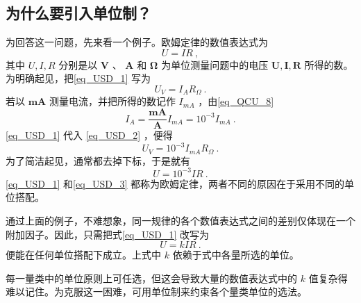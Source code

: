 


\subsection{为什么要引入单位制？}
为回答这一问题，先来看一个例子。欧姆定律的数值表达式为
\begin{equation}\label{eq_USD_1}
U=IR~,
\end{equation}
其中 $U,I,R$ 分别是以 \textbf{$\boldsymbol{V}$ }、\textbf{ $\boldsymbol{A}$ }和\textbf{ $\boldsymbol{\Omega}$ }为单位测量问题中的电压 $\boldsymbol{U},\boldsymbol{I},\boldsymbol{R}$ 所得的数。为明确起见，把\autoref{eq_USD_1} 写为
\begin{equation}
U_{V}=I_{A}R_{\Omega}~.
\end{equation}
若以 \textbf{$\boldsymbol{mA}$} 测量电流，并把所得的数记作 $I_{mA}$ ，由\autoref{eq_QCU_8}~ 
\begin{equation}\label{eq_USD_2}
I_{A}=\frac{\boldsymbol{mA}}{\boldsymbol{A}}I_{mA}=10^{-3}I_{mA}~.
\end{equation}
\autoref{eq_USD_1} 代入 \autoref{eq_USD_2} ，便得
\begin{equation}
U_{V}=10^{-3}I_{mA}R_{\Omega}~.
\end{equation}
为了简洁起见，通常都去掉下标，于是就有
\begin{equation}\label{eq_USD_3}
U=10^{-3}IR~.
\end{equation}
\autoref{eq_USD_1} 和\autoref{eq_USD_3} 都称为欧姆定律，两者不同的原因在于采用不同的单位搭配。

通过上面的例子，不难想象，同一规律的各个数值表达式之间的差别仅体现在一个附加因子。因此，只需把式\autoref{eq_USD_1} 改写为
\begin{equation}\label{eq_USD_10}
U=kIR~.
\end{equation}
便能在任何单位搭配下成立。上式中 $k$ 依赖于式中各量所选的单位。

每一量类中的单位原则上可任选，但这会导致大量的数值表达式中的 $k$ 值复杂得难以记住。为克服这一困难，可用单位制来约束各个量类单位的选法。
